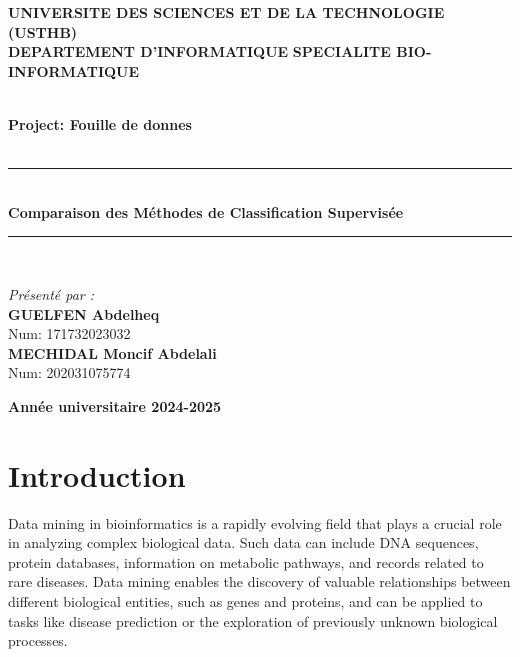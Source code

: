 \documentclass[a4paper,12pt]{article}
\begin{document}
\begin{titlepage}
  \begin{center}
    \begin{minipage}{10cm}
      \begin{center}
        \textbf{UNIVERSITE DES SCIENCES ET DE LA TECHNOLOGIE (USTHB)}\\[0.1cm]
        \textbf{DEPARTEMENT D'INFORMATIQUE}
        \textbf{SPECIALITE BIO-INFORMATIQUE}
      \end{center}
    \end{minipage}\hfill


    \textsc{\Large }\\[2.5cm]
    {\large \bfseries Project: Fouille de donnes }\\[1cm]

    \textsc{\Large }\\[1cm]
    \rule{\linewidth}{0.3mm} \\[0.4cm]
    { \huge \bfseries\color{blue}Comparaison des Méthodes de Classification Supervisée \\[0.4cm] }
    \rule{\linewidth}{0.3mm} \\[3cm]


    \noindent
    \begin{minipage}{0.6\textwidth}
      \begin{flushleft} \large
        \emph{Présenté par :}\\[0.2cm]
        \textbf{GUELFEN Abdelheq}\\
        Num: 171732023032\\[0.5cm]
        \textbf{MECHIDAL Moncif Abdelali}\\
        Num: 202031075774\\
      \end{flushleft}
    \end{minipage}

    \vfill

    {\textbf{\large {Année universitaire} 2024-2025}}
  \end{center}
\end{titlepage}

\tableofcontents
\newpage
\section{Introduction}
Data mining in bioinformatics is a rapidly evolving field that plays a crucial role in analyzing complex biological data. Such data can include DNA sequences, protein databases, information on metabolic pathways, and records related to rare diseases. Data mining enables the discovery of valuable relationships between different biological entities, such as genes and proteins, and can be applied to tasks like disease prediction or the exploration of previously unknown biological processes.\\
\end{document}
